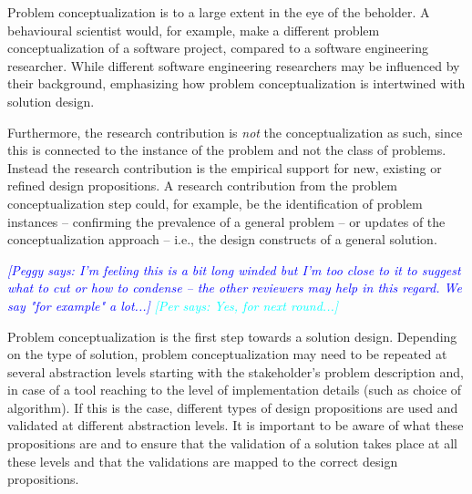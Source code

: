 \documentclass[graybox]{svmult}
\newcommand{\peggy}[1]{\textcolor{blue}{{\it [Peggy says: #1]}}}
\newcommand{\per}[1]{\textcolor{cyan}{{\it [Per says: #1]}}}
\newcommand{\peggy}[1]{}
\newcommand{\per}[1]{}
\begin{document}
Problem conceptualization is to a large extent in the eye of the beholder. A behavioural scientist would, for example,  make a different problem conceptualization of a software project, compared to a software engineering researcher. While different software engineering researchers may be influenced by their background, emphasizing how problem conceptualization is intertwined with solution design.


Furthermore, the research contribution is \emph{not} the conceptualization as such, since this is connected to the instance of the problem and not the class of problems. Instead the research contribution is the empirical support for new, existing or refined design propositions. A research contribution from the problem conceptualization step could, for example, be the identification of problem instances -- confirming the prevalence of a general problem -- or updates of the conceptualization approach -- i.e., the design constructs of a general solution.

\peggy{I'm feeling this is a bit long winded but I'm too close to it to suggest what to cut or how to condense -- the other reviewers may help in this regard.  We say "for example" a lot...} \per{Yes, for next round...}


Problem conceptualization is the first step towards a solution design. Depending on the type of solution, problem conceptualization may need to be repeated at several abstraction levels starting with the stakeholder's problem description and, in case of a tool reaching to the level of implementation details (such as  choice of algorithm). If this is the case, different types of design propositions are used and validated at different abstraction levels. It is important to be aware of what these propositions are and to ensure that the validation of a solution takes place at all these levels and that the validations are mapped to the correct design propositions. 
\end{document}
